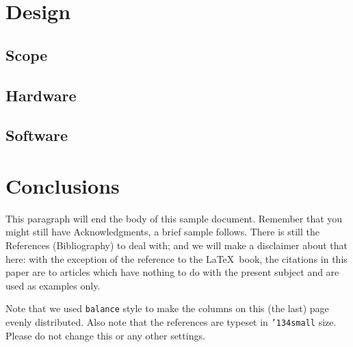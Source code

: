 \documentclass[10pt,nocopyrightspace]{ewsn-proc}
\begin{document}
\section{Design}

\subsection{Scope}

\subsection{Hardware}

\subsection{Software}


\section{Conclusions}
This paragraph will end the body of this sample document.
Remember that you might still have Acknowledgments, a brief sample
follows.  There is still the References (Bibliography) to deal with; and
we will make a disclaimer about that here: with the exception
of the reference to the \LaTeX\ book, the citations in
this paper are to articles which have nothing to
do with the present subject and are used as
examples only.

\newpage

%
%

Note that we used \texttt{balance} style to make the columns on this (the last) page evenly distributed. Also note that the references are typeset in \texttt{{\char'134}small} size. Please do not change this or any other settings.


%
%
\balance

\end{document}
